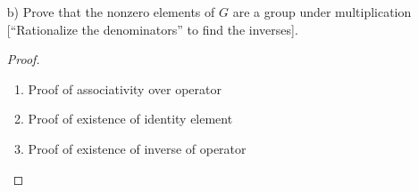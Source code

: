 \documentclass[11pt]{article}
\theoremstyle{definition}  %
\begin{document}
\begin{enumerate}
\begin{itemize}
\begin{proof}
\begin{enumerate}
      \begin{align*}
        &(a+b)+c=a+(b+c)\\
        &(a_1+b_1\sqrt{2}+a_2+b_2\sqrt{2})+a_3+b_3\sqrt{2}=a_1+(b_1\sqrt{2}+a_2+b_2\sqrt{2}+a_3+b_3\sqrt{2})\\
        &a_1+b_1\sqrt{2}+a_2+b_2\sqrt{2}+a_3+b_3\sqrt{2}=a_1+b_1\sqrt{2}+a_2+b_2\sqrt{2}+a_3+b_3\sqrt{2}
      \end{align*}
      \item Proof of existence of identity element
      \item  Proof of existence of inverse of operator
    \end{enumerate}
  \end{proof}
   \item[b)] Prove that the nonzero elements of $G$ are a group under multiplication [``Rationalize the denominators'' to find the inverses].
   \begin{proof}
     \begin{enumerate}
       \item Proof of associativity over operator
       \item Proof of existence of identity element
       \item  Proof of existence of inverse of operator
     \end{enumerate}
   \end{proof}
  \end{itemize}
 \end{enumerate}
\end{document}
